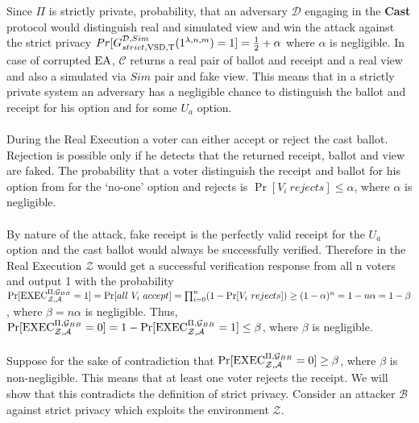 \\\\
 Since $\Pi$ is strictly private, probability, that an adversary $\mathcal{D}$ engaging in the \textbf{Cast} protocol would distinguish real and simulated view and win the attack against the strict privacy $Pr[G_{strict,\operatorname{VSD},\operatorname{T}}^{\mathcal{D},Sim}(1^{\lambda,n,m}) = 1] = \frac{1}{2} + \alpha$ where $\alpha$ is negligible. In case of corrupted $\operatorname{EA}$, $\mathcal{C}$ returns a real pair of ballot and receipt and a real view and also a simulated via $Sim$ pair and fake view. This means that in a strictly private system an adversary has a negligible chance to distinguish the ballot and receipt for his option and for some $U_a$ option. \\\\
During the Real Execution a voter can either accept or reject the cast ballot. Rejection is possible only if he detects that the returned receipt, ballot and view are faked. The probability that a voter distinguish the receipt and ballot for his option from for the `no-one' option and rejects is $\Pr[V_i~rejects] \leq  \alpha$, where $\alpha$ is negligible.\\\\
 By nature of the attack,  fake receipt is the perfectly valid receipt for the $U_a$ option and the cast ballot would always be successfully verified. Therefore in the Real Execution $\mathcal{Z}$ would get a successful verification response from all n voters and output 1 with the probability $\Pr[\operatorname{EXEC}_{\mathcal{Z},\mathcal{A}}^{\Pi, \mathcal{G}_{BB}} = 1] =  \Pr[all~V_i~accept] = \prod_{i=0}^n(1- \Pr[V_i~rejects] ) \geq (1 - \alpha)^n = 1 - n\alpha = 1- \beta$, where $\beta = n\alpha $ is negligible. Thus, $\Pr[\operatorname{EXEC}_{\mathcal{Z},\mathcal{A}}^{\Pi, \mathcal{G}_{BB}} = 0] = 1 - \Pr[\operatorname{EXEC}_{\mathcal{Z},\mathcal{A}}^{\Pi, \mathcal{G}_{BB}} = 1] \leq \beta$, where $\beta$ is negligible.\\\\
Suppose for the sake of contradiction that $\Pr[\operatorname{EXEC}_{\mathcal{Z},\mathcal{A}}^{\Pi, \mathcal{G}_{BB}} = 0] \geq  \beta$, where $\beta$ is non-negligible. This means that at least one voter rejects the receipt. We will show that this contradicts the definition of strict privacy. Consider an attacker $\mathcal{B}$ against strict privacy which exploits the environment  $\mathcal{Z}$. \\\\

